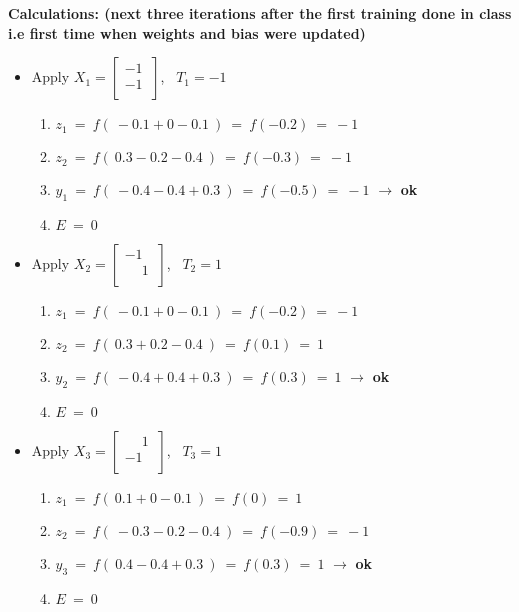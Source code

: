 \documentclass[12pt]{article}
\begin{document}
\BlankLine
\BlankLine
\textbf{Calculations: (next three iterations after the first training done in class i.e first time when weights and bias were updated)}
\begin{itemize}
	
	\item Apply $X_1 = \begin{bmatrix}
		-1\ \\ 	
		-1\ \\ 	
	\end{bmatrix}$, \  $T_1 = -1$

		{	
			\begin{enumerate}
				\item $z_1 \ = \ f(\ -0.1  +  0 - 0.1 \ ) \ = \ f(-0.2) \ = \ -1$
				\item $z_2 \ = \ f(\ 0.3 -  0.2 - 0.4 \ ) \ = \ f(-0.3) \ = \ -1$
				\item $y_1 \ = \ f (\ -0.4 - 0.4 + 0.3 \ )\ = \ f(-0.5)  \ = \ -1$ $\rightarrow$ \textbf{ok}
				\item $E \ = \ 0$
			\end{enumerate}
		
		}
	
	\item Apply $X_2 = \begin{bmatrix}
		-1\ \\ 	
		\phantom{-}1\ \\ 	
	\end{bmatrix}$, \  $T_2 = 1$

		{	
			\begin{enumerate}
				\item $z_1 \ = \ f(\ -0.1  +  0 - 0.1 \ ) \ = \ f(-0.2) \ = \ -1$
				\item $z_2 \ = \ f(\ 0.3 + 0.2 - 0.4 \ ) \ = \ f(0.1) \ = \ 1$
				\item $y_2 \ = \ f (\ -0.4 + 0.4 + 0.3 \ )\ = \ f(0.3)  \ = \ 1$ $\rightarrow$ \textbf{ok}
				\item $E \ = \ 0$
			\end{enumerate}
			
		}
	
	\item Apply $X_3 = \begin{bmatrix}
		\phantom{-}1\ \\ 	
		-1\ \\ 	
	\end{bmatrix}$, \  $T_3 = 1$

		{	
			\begin{enumerate}
				\item $z_1 \ = \ f(\ 0.1  +  0 - 0.1 \ ) \ = \ f(0) \ = \ 1$
				\item $z_2 \ = \ f(\ -0.3 - 0.2 - 0.4 \ ) \ = \ f(-0.9) \ = \ -1$
				\item $y_3 \ = \ f (\ 0.4 - 0.4 + 0.3 \ )\ = \ f(0.3)  \ = \ 1$ $\rightarrow$ \textbf{ok}
				\item $E \ = \ 0$
			\end{enumerate}
			
}
\end{itemize}
\end{document}
